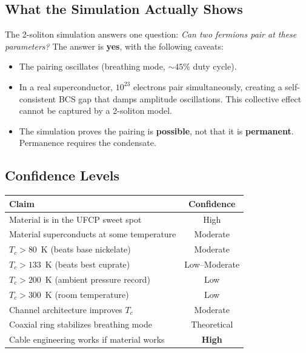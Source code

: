 \documentclass[11pt, a4paper]{article}
\begin{document}
\subsection{What the Simulation Actually Shows}

The 2-soliton simulation answers one question: \textit{Can two
fermions pair at these parameters?} The answer is \textbf{yes},
with the following caveats:

\begin{itemize}[nosep]
  \item The pairing oscillates (breathing mode, $\sim 45\%$ duty
        cycle).
  \item In a real superconductor, $10^{23}$ electrons pair
        simultaneously, creating a self-consistent BCS gap that
        damps amplitude oscillations. This collective effect
        cannot be captured by a 2-soliton model.
  \item The simulation proves the pairing is \textbf{possible},
        not that it is \textbf{permanent}. Permanence requires
        the condensate.
\end{itemize}

\subsection{Confidence Levels}

\begin{center}
\begin{tabular}{@{}lc@{}}
\toprule
\textbf{Claim} & \textbf{Confidence} \\
\midrule
Material is in the UFCP sweet spot & High \\
Material superconducts at some temperature & Moderate \\
$T_c > 80$~K (beats base nickelate) & Moderate \\
$T_c > 133$~K (beats best cuprate) & Low--Moderate \\
$T_c > 200$~K (ambient pressure record) & Low \\
$T_c > 300$~K (room temperature) & Low \\
Channel architecture improves $T_c$ & Moderate \\
Coaxial ring stabilizes breathing mode & Theoretical \\
Cable engineering works if material works & \textbf{High} \\
\bottomrule
\end{tabular}
\end{center}
\end{document}
